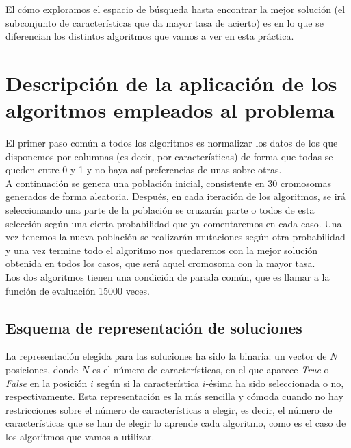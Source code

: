 \documentclass[12pt]{article}
\begin{document}
El cómo exploramos el espacio de búsqueda hasta encontrar la mejor solución (el subconjunto de características que da mayor tasa de acierto) es en lo que se diferencian los distintos algoritmos que vamos a ver en esta práctica.

\newpage

\section{Descripción de la aplicación de los algoritmos empleados al problema}
El primer paso común a todos los algoritmos es normalizar los datos de los que disponemos por columnas (es decir, por características) de forma que todas se queden entre 0 y 1 y no haya así preferencias de unas sobre otras.\\

A continuación se genera una población inicial, consistente en 30 cromosomas generados de forma aleatoria. Después, en cada iteración de los algoritmos, se irá seleccionando una parte de la población se cruzarán parte o todos de esta selección según una cierta probabilidad que ya comentaremos en cada caso. Una vez tenemos la nueva población se realizarán mutaciones según otra probabilidad y una vez termine todo el algoritmo nos quedaremos con la mejor solución obtenida en todos los casos, que será aquel cromosoma con la mayor tasa.\\

Los dos algoritmos tienen una condición de parada común, que es llamar a la función de evaluación 15000 veces.

\subsection{Esquema de representación de soluciones}
La representación elegida para las soluciones ha sido la binaria: un vector de $N$ posiciones, donde $N$ es el número de características, en el que aparece \textit{True} o \textit{False} en la posición $i$ según si la característica $i$-ésima ha sido seleccionada o no, respectivamente. Esta representación es la más sencilla y cómoda cuando no hay restricciones sobre el número de características a elegir, es decir, el número de características que se han de elegir lo aprende cada algoritmo, como es el caso de los algoritmos que vamos a utilizar.
\end{document}
